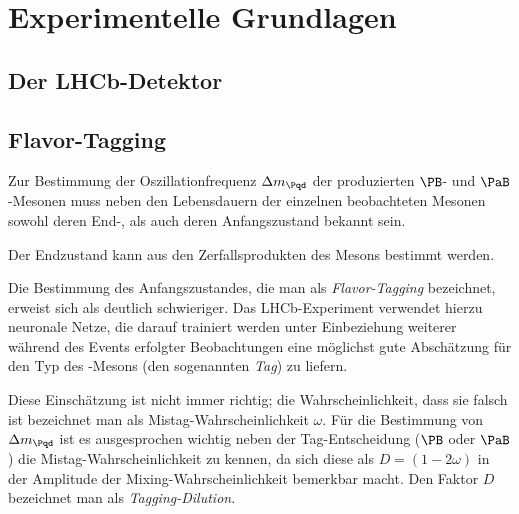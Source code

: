 
\section{Experimentelle Grundlagen}


\subsection{Der LHCb-Detektor}


\subsection{Flavor-Tagging}

Zur Bestimmung der Oszillationfrequenz $\Delta m_{\Pqd}$ der produzierten $\PB$- und $\PaB$-Mesonen muss neben den Lebensdauern der einzelnen beobachteten Mesonen sowohl deren End-, als auch deren Anfangszustand bekannt sein.

Der Endzustand kann aus den Zerfallsprodukten des Mesons bestimmt werden.

Die Bestimmung des Anfangszustandes, die man als \emph{Flavor-Tagging} bezeichnet, erweist sich als deutlich schwieriger.
Das LHCb-Experiment verwendet hierzu neuronale Netze, die darauf trainiert werden unter Einbeziehung weiterer während des Events erfolgter Beobachtungen eine möglichst gute Abschätzung für den Typ des \PB-Mesons (den sogenannten \emph{Tag}) zu liefern. %

Diese Einschätzung ist nicht immer richtig; die Wahrscheinlichkeit, dass sie falsch ist bezeichnet man als Mistag-Wahrscheinlichkeit $\omega$.
Für die Bestimmung von $\Delta m_{\Pqd}$ ist es ausgesprochen wichtig neben der Tag-Entscheidung ($\PB$ oder $\PaB$) die Mistag-Wahrscheinlichkeit zu kennen, da sich diese als $D = (1 - 2\omega)$ in der Amplitude der Mixing-Wahrscheinlichkeit bemerkbar macht. Den Faktor $D$ bezeichnet man als \emph{Tagging-Dilution}.

